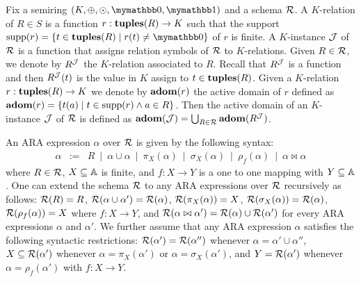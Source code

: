 Fix a semiring $(K, \ksum, \kprod, \kzero, \kone)$ and a schema $\mathcal{R}$. A $K$-relation of $R \in S$ is a function $r: \mathbf{tuples}(R) \rightarrow K$ such that the support  $\supp(r) = \{t \in \tuples(R) \mid r(t) \neq \kzero\}$ of $r$ is finite. 
A $K$-instance $\mathcal{J}$ of $\mathcal{R}$ is a function that assigns relation symbols of $\mathcal{R}$ to $K$-relations. Given $R \in \mathcal{R}$, we denote by $R^{\mathcal{J}}$ the $K$-relation associated to $R$. Recall that $R^{\mathcal{J}}$ is a function and then $R^{\mathcal{J}}(t)$ is the value in $K$ assign to $t \in \mathbf{tuples}(R)$. 
Given a $K$-relation $r:\mathbf{tuples}(R) \rightarrow K$ we denote by $\mathbf{adom}(r)$ the active domain of $r$ defined as $\mathbf{adom}(r) = \{t(a) \mid t \in \operatorname{supp}(r) \wedge a \in R\}$.
Then the active domain of an $K$-instance $\mathcal{J}$ of $\mathcal{R}$ is defined as $\mathbf{adom}(\mathcal{J}) = \bigcup_{R \in \mathcal{R}} \mathbf{adom}(R^{\mathcal{J}})$.

An ARA expression $\alpha$ over $\mathcal{R}$ is given by the following syntax:
$$
\begin{array}{rcl}
\alpha & := & R \ \mid \ \alpha \cup \alpha \ \mid \  \pi_X(\alpha) \ \mid \  \sigma_X(\alpha) \ \mid \ \rho_f(\alpha) \ \mid \ \alpha \bowtie \alpha
\end{array}
$$
where $R \in \mathcal{R}$, $X \subseteq \mathbb{A}$ is finite, and $f: X \rightarrow Y$ is a one to one mapping with $Y \subseteq \mathbb{A}$. One can extend the schema $\mathcal{R}$ to any ARA expressions over $\mathcal{R}$ recursively as follows: $\mathcal{R}(R) = R$, $\mathcal{R}(\alpha \cup \alpha') = \mathcal{R}(\alpha)$, $\mathcal{R}(\pi_X(\alpha)) = X$, $\mathcal{R}(\sigma_X(\alpha)) = \mathcal{R}(\alpha)$, $\mathcal{R}(\rho_f(\alpha)) = X$ where $f:X \rightarrow Y$, and $\mathcal{R}(\alpha \bowtie \alpha') = \mathcal{R}(\alpha) \cup \mathcal{R}(\alpha')$ for every ARA expressions $\alpha$ and $\alpha'$.
We further assume that any ARA expression $\alpha$ satisfies the following syntactic restrictions: $\mathcal{R}(\alpha') = \mathcal{R}(\alpha'')$ whenever $\alpha = \alpha' \cup \alpha''$, $X \subseteq \mathcal{R}(\alpha')$ whenever $\alpha = \pi_X(\alpha')$ or $\alpha = \sigma_X(\alpha')$, and $Y = \mathcal{R}(\alpha')$ whenever $\alpha = \rho_f(\alpha')$ with $f: X \rightarrow Y$.


